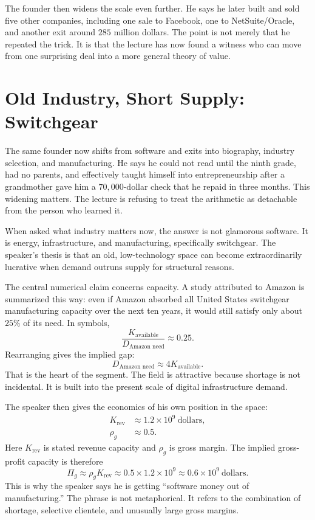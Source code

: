 The founder then widens the scale even further. He says he later built and sold five other companies, including one sale to Facebook, one to NetSuite/Oracle, and another exit around \(285\) million dollars. The point is not merely that he repeated the trick. It is that the lecture has now found a witness who can move from one surprising deal into a more general theory of value.

\section{Old Industry, Short Supply: Switchgear}

The same founder now shifts from software and exits into biography, industry selection, and manufacturing. He says he could not read until the ninth grade, had no parents, and effectively taught himself into entrepreneurship after a grandmother gave him a \(70{,}000\)-dollar check that he repaid in three months. This widening matters. The lecture is refusing to treat the arithmetic as detachable from the person who learned it.

When asked what industry matters now, the answer is not glamorous software. It is energy, infrastructure, and manufacturing, specifically switchgear. The speaker's thesis is that an old, low-technology space can become extraordinarily lucrative when demand outruns supply for structural reasons.

The central numerical claim concerns capacity. A study attributed to Amazon is summarized this way: even if Amazon absorbed all United States switchgear manufacturing capacity over the next ten years, it would still satisfy only about \(25\%\) of its need. In symbols,
\begin{equation}
\frac{K_{\text{available}}}{D_{\text{Amazon need}}} \approx 0.25.
\end{equation}
Rearranging gives the implied gap:
\begin{equation}
D_{\text{Amazon need}} \approx 4 K_{\text{available}}.
\end{equation}
That is the heart of the segment. The field is attractive because shortage is not incidental. It is built into the present scale of digital infrastructure demand.

The speaker then gives the economics of his own position in the space:
\begin{align}
K_{\text{rev}} &\approx 1.2 \times 10^9 \ \text{dollars},\\
\rho_g &\approx 0.5.
\end{align}
Here \(K_{\text{rev}}\) is stated revenue capacity and \(\rho_g\) is gross margin. The implied gross-profit capacity is therefore
\begin{equation}
\Pi_g \approx \rho_g K_{\text{rev}}
\approx 0.5 \times 1.2 \times 10^9
\approx 0.6 \times 10^9 \ \text{dollars}.
\end{equation}
This is why the speaker says he is getting ``software money out of manufacturing.'' The phrase is not metaphorical. It refers to the combination of shortage, selective clientele, and unusually large gross margins.

